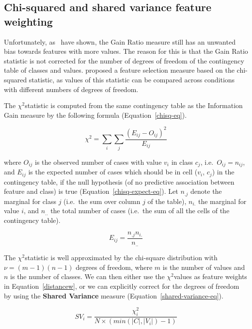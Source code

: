 \documentclass{report}
\newcommand{\chisq}{{$ \chi^2 $}}
\begin{document}
\subsection{Chi-squared and shared variance feature weighting}
\label{chisquared}

Unfortunately, as~ have shown, the Gain Ratio measure
still has an unwanted bias towards features with more values. The
reason for this is that the Gain Ratio statistic is not corrected for
the number of degrees of freedom of the contingency table of classes
and values.  proposed a feature selection measure based
on the chi-squared statistic, as values of this statistic can be
compared across conditions with different numbers of degrees of
freedom.

The \chisq statistic is computed from the same contingency table as
the Information Gain measure by the following formula
(Equation~\ref{chisq-eq}).

\begin{equation} 
\chi^{2} = \sum_{i} \sum_{j} \frac{(E_{ij} - O_{ij})^{2}}
				  {E_{ij}} 
\label{chisq-eq}
\end{equation} 

where $O_{ij}$ is the observed number of cases with value $v_{i}$ in
class $c_{j}$, i.e.~$O_{ij} = n_{ij}$, and $E_{ij}$ is the expected
number of cases which should be in cell ($v_{i}$, $c_{j}$) in the
contingency table, if the null hypothesis (of no predictive
association between feature and class) is true
(Equation~\ref{chisq-expect-eq}). Let $n_{.j}$ denote the marginal for
class $j$ (i.e.~the sum over column $j$ of the table), $n_{i.}$ the
marginal for value $i$, and $n_{..}$ the total number of cases
(i.e.~the sum of all the cells of the contingency table).

\begin{equation}
E_{ij} = \frac{n_{.j} n_{i.}}{n_{..}}
\label{chisq-expect-eq}
\end{equation}

The \chisq statistic is well approximated by the chi-square
distribution with $\nu = (m-1)(n-1)$ degrees of freedom, where $m$ is
the number of values and $n$ is the number of classes. We can then
either use the \chisq values as feature weights in
Equation~\ref{distancew}, or we can explicitly correct for the degrees
of freedom by using the {\bf Shared Variance} measure
(Equation~\ref{shared-variance-eq}).

\begin{equation}
SV_{i} = \frac{ \chi^2_{i}}{N \times ( min(|C|,|V_{i}|)-1 ) }
\label{shared-variance-eq}
\end{equation}
\end{document}
